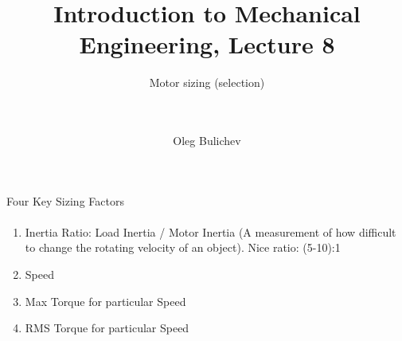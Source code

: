 \documentclass[aspectratio=169]{beamer}
\title[IME]{Introduction to Mechanical Engineering, Lecture 8} %
\subtitle{Motor sizing (selection)
\\ \        \\ \   
         } %
\author{Oleg Bulichev}
\newcommand{\fbckg}[1]{\usebackgroundtemplate{\texttt{[image: \#1]}}}%
\begin{document}
\setlength{\abovedisplayskip}{0pt}
\setlength{\belowdisplayskip}{0pt}
\setlength{\abovedisplayshortskip}{0pt}
\setlength{\belowdisplayshortskip}{0pt}

\fbckg{fibeamer/figs/title_page.png}

\fbckg{fibeamer/figs/common.png}

\note{\scriptsize \begin{itemize}
        \item \ 
    \end{itemize}}

\begin{frame}[t]{Four Key Sizing Factors}
\framesubtitle{}
    \begin{enumerate}
        \item Inertia Ratio: Load Inertia / Motor Inertia (A measurement of how difficult to change the rotating velocity of an object). Nice ratio: (5-10):1
        \item Speed
        \item Max Torque for particular Speed
        \item RMS Torque for particular Speed
    \end{enumerate}
\end{frame}
\end{document}
